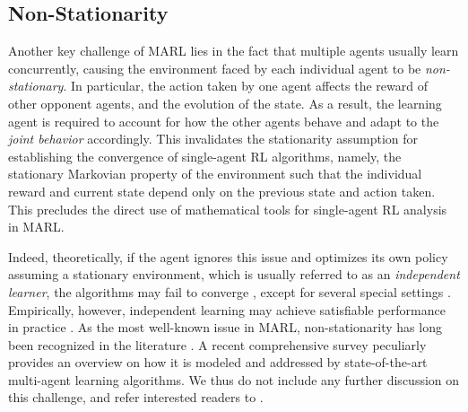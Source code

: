 

\subsection{Non-Stationarity}\label{subsec:non_stationary}

Another key challenge of MARL lies in the fact that multiple agents usually learn concurrently, causing the  environment faced by each individual agent to be \emph{non-stationary}. 
In particular,  the action taken by one agent affects the reward of  other opponent agents, and the evolution of the state. 
As a result, the learning agent is required to account for how the other agents behave and adapt to the \emph{joint behavior} accordingly. 
This   invalidates the stationarity  assumption for establishing the convergence of single-agent RL algorithms, namely, the stationary Markovian property of the environment such that the individual reward and current state depend only on the previous state and action taken. This precludes the direct use of mathematical tools for single-agent RL analysis in MARL. 


Indeed, theoretically, if the agent ignores this issue and optimizes its own policy assuming a stationary environment, which is usually referred to as an \emph{independent learner}, the algorithms may fail to converge \cite{tan1993multi,claus1998dynamics}, except for several special settings \cite{arslan2017decentralized,yongacoglu2019learning}. Empirically, however,  independent learning may achieve satisfiable performance in  practice  \cite{matignon2012independent,foerster2017stabilising}.  
As the most well-known issue in MARL, non-stationarity has long been recognized in 
the literature  \cite{bu2008comprehensive,tuyls2012multiagent}. A recent comprehensive survey \cite{hernandez2017survey} peculiarly 
provides an overview  on how  it is modeled and addressed by  state-of-the-art  multi-agent learning algorithms. We thus do not include any further discussion on this challenge, and refer interested readers to \cite{hernandez2017survey}. 



